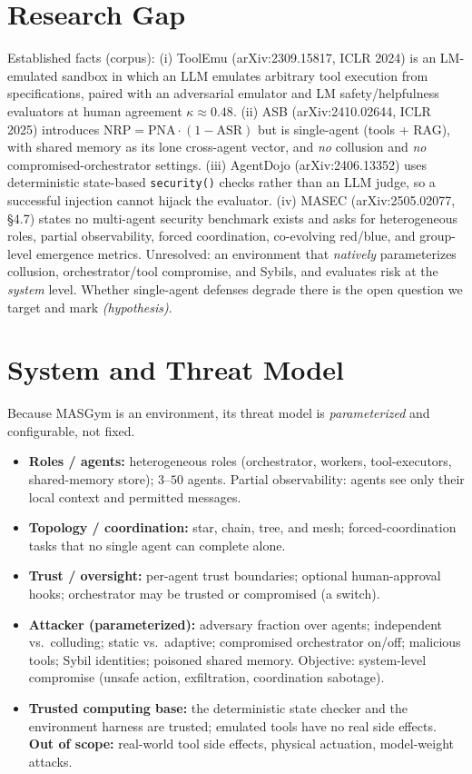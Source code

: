\documentclass[11pt]{article}
\newcommand{\hyp}{\textit{(hypothesis)}\xspace}
\begin{document}
\section*{Research Gap}
Established facts (corpus): (i) ToolEmu (arXiv:2309.15817, ICLR 2024) is an LM-emulated sandbox in which an LLM emulates arbitrary tool execution from specifications, paired with an adversarial emulator and LM safety/helpfulness evaluators at human agreement $\kappa \approx 0.48$. (ii) ASB (arXiv:2410.02644, ICLR 2025) introduces $\mathrm{NRP} = \mathrm{PNA}\cdot(1-\mathrm{ASR})$ but is single-agent (tools + RAG), with shared memory as its lone cross-agent vector, and \emph{no} collusion and \emph{no} compromised-orchestrator settings. (iii) AgentDojo (arXiv:2406.13352) uses deterministic state-based \texttt{security()} checks rather than an LLM judge, so a successful injection cannot hijack the evaluator. (iv) MASEC (arXiv:2505.02077, \S4.7) states no multi-agent security benchmark exists and asks for heterogeneous roles, partial observability, forced coordination, co-evolving red/blue, and group-level emergence metrics. Unresolved: an environment that \emph{natively} parameterizes collusion, orchestrator/tool compromise, and Sybils, and evaluates risk at the \emph{system} level. Whether single-agent defenses degrade there is the open question we target and mark \hyp.

\section*{System and Threat Model}
Because MASGym is an environment, its threat model is \emph{parameterized} and configurable, not fixed.
\begin{itemize}
\item \textbf{Roles / agents:} heterogeneous roles (orchestrator, workers, tool-executors, shared-memory store); $3$--$50$ agents. Partial observability: agents see only their local context and permitted messages.
\item \textbf{Topology / coordination:} star, chain, tree, and mesh; forced-coordination tasks that no single agent can complete alone.
\item \textbf{Trust / oversight:} per-agent trust boundaries; optional human-approval hooks; orchestrator may be trusted or compromised (a switch).
\item \textbf{Attacker (parameterized):} adversary fraction over agents; independent vs.\ colluding; static vs.\ adaptive; compromised orchestrator on/off; malicious tools; Sybil identities; poisoned shared memory. Objective: system-level compromise (unsafe action, exfiltration, coordination sabotage).
\item \textbf{Trusted computing base:} the deterministic state checker and the environment harness are trusted; emulated tools have no real side effects. \textbf{Out of scope:} real-world tool side effects, physical actuation, model-weight attacks.
\end{itemize}
\end{document}
